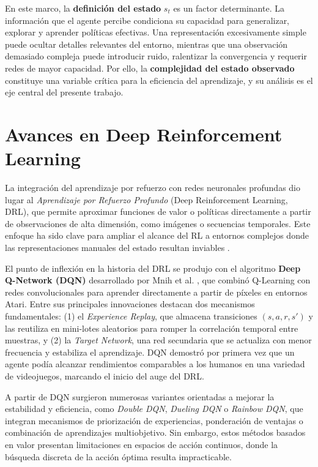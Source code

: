 En este marco, la \textbf{definición del estado} $s_t$ es un factor determinante.  
La información que el agente percibe condiciona su capacidad para generalizar, explorar y aprender políticas efectivas. Una representación excesivamente simple puede ocultar detalles relevantes del entorno, mientras que una observación demasiado compleja puede introducir ruido, ralentizar la convergencia y requerir redes de mayor capacidad.  
Por ello, la \textbf{complejidad del estado observado} constituye una variable crítica para la eficiencia del aprendizaje, y su análisis es el eje central del presente trabajo.

\vspace{0.5em}

\section{Avances en Deep Reinforcement Learning}

La integración del aprendizaje por refuerzo con redes neuronales profundas dio lugar al \textit{Aprendizaje por Refuerzo Profundo} (Deep Reinforcement Learning, DRL), que permite aproximar funciones de valor o políticas directamente a partir de observaciones de alta dimensión, como imágenes o secuencias temporales.  
Este enfoque ha sido clave para ampliar el alcance del RL a entornos complejos donde las representaciones manuales del estado resultan inviables \citep{Mnih2015}.

El punto de inflexión en la historia del DRL se produjo con el algoritmo \textbf{Deep Q-Network (DQN)} desarrollado por Mnih et al. \citeyearpar{Mnih2015}, que combinó Q-Learning con redes convolucionales para aprender directamente a partir de píxeles en entornos Atari.  
Entre sus principales innovaciones destacan dos mecanismos fundamentales:  
(1) el \textit{Experience Replay}, que almacena transiciones $(s,a,r,s')$ y las reutiliza en mini-lotes aleatorios para romper la correlación temporal entre muestras, y  
(2) la \textit{Target Network}, una red secundaria que se actualiza con menor frecuencia y estabiliza el aprendizaje.  
DQN demostró por primera vez que un agente podía alcanzar rendimientos comparables a los humanos en una variedad de videojuegos, marcando el inicio del auge del DRL.

A partir de DQN surgieron numerosas variantes orientadas a mejorar la estabilidad y eficiencia, como \textit{Double DQN}, \textit{Dueling DQN} o \textit{Rainbow DQN}, que integran mecanismos de priorización de experiencias, ponderación de ventajas o combinación de aprendizajes multiobjetivo.  
Sin embargo, estos métodos basados en valor presentan limitaciones en espacios de acción continuos, donde la búsqueda discreta de la acción óptima resulta impracticable.

